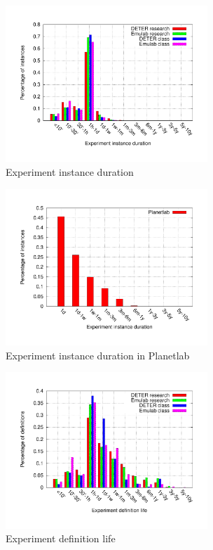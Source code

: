 \documentclass[10pt, twocolumn]{article} %
\begin{document}
\begin{figure}[htbp] \begin{center} \includegraphics[width=3in,
type=pdf,ext=.pdf,read=.pdf]{figs/exp.dur.gnu} \caption{Experiment
instance duration} \label{expdur} \end{center} \end{figure}

\begin{figure}[htbp] \begin{center} \includegraphics[width=3in,
type=pdf,ext=.pdf,read=.pdf]{figs/planet.dur.gnu} \caption{Experiment
instance duration in Planetlab} \label{expdur} \end{center} \end{figure}

\begin{figure}[htbp] \begin{center} \includegraphics[width=3in,
type=pdf,ext=.pdf,read=.pdf]{figs/exp.life.gnu} \caption{Experiment
definition life} \label{explife} \end{center} \end{figure}
\end{document}
